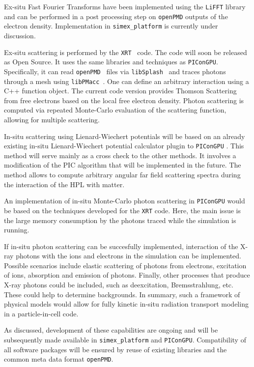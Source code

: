 \documentclass[a4paper]{article}
\begin{document}
Ex-situ Fast Fourier Transforms have been implemented using the \texttt{LiFFT} library \cite{liblifft_github} and can be performed in a post processing step on \texttt{openPMD} outputs of the electron density. Implementation in \texttt{simex\_platform} is currently under discussion.

Ex-situ scattering is performed by the \texttt{XRT}~\cite{xrt_github} code. The code will soon be released as Open Source. It uses the same libraries and techniques as \texttt{PIConGPU}. Specifically, it can read \texttt{openPMD}~\cite{openPMD} files via \texttt{libSplash}~\cite{libSplash_github} and traces photons through a mesh using \texttt{libPMacc}~\cite{picongpu_github}. One can define an arbitrary interaction using a C++ function object. The current code version provides Thomson Scattering from free electrons based on the local free electron density. Photon scattering is computed via repeated Monte-Carlo evaluation of the scattering function, allowing for multiple scattering.

In-situ scattering using Lienard-Wiechert potentials will be based on an already existing in-situ Lienard-Wiechert potential calculator plugin to \texttt{PIConGPU} \cite{Pausch2013}. This method will serve mainly as a cross check to the other methods. It involves a modification of the PIC algorithm that will be implemented in the future. The method allows to compute arbitrary angular far field scattering spectra during the interaction of the HPL with matter.

An implementation of in-situ Monte-Carlo photon scattering in \texttt{PIConGPU} would be based on the techniques developed for the \texttt{XRT} code. Here, the main issue is the large memory consumption by the photons traced while the simulation is running.

If in-situ photon scattering can be succesfully implemented, interaction of the X-ray photons with the ions and electrons in the simulation can be implemented. Possible scenarios include elastic scattering of photons from electrons, excitation of ions, absorption and emission of photons. Finally, other processes that produce X-ray photons could be included, such as deexcitation, Bremsstrahlung, etc. These could help to determine backgrounds. In summary, such a framework of physical models would allow for fully kinetic in-situ radiation transport modeling in a particle-in-cell code.

As discussed, development of these capabilities are ongoing and will be subsequently made available in \texttt{simex\_platform} and \texttt{PIConGPU}. Compatibility of all software packages will be ensured by reuse of existing libraries and the common meta data format \texttt{openPMD}.
\end{document}
